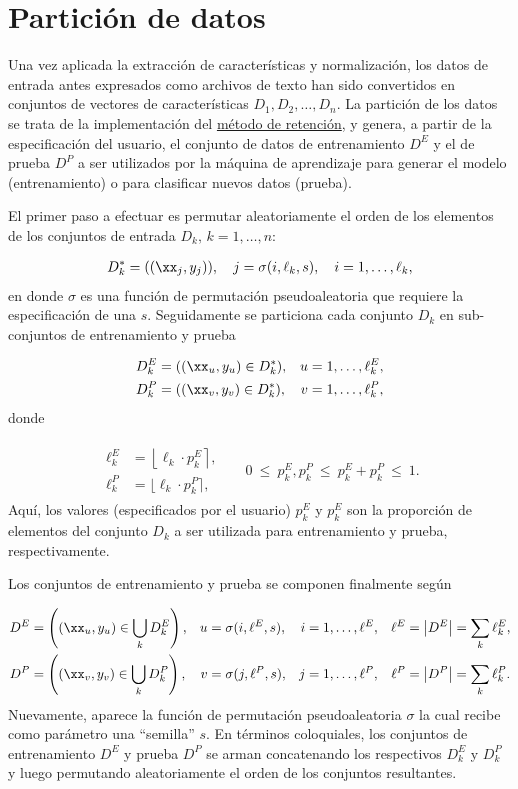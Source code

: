 \section{Partición de datos}
Una vez aplicada la extracción de características y normalización, los
datos de entrada antes expresados como archivos de texto han sido
convertidos en conjuntos de vectores de características
$D_1,D_2,\ldots,D_n$.  La partición de los datos se trata de la
implementación del \hyperref[retención]{método de retención}, y
genera, a partir de la especificación del usuario, el conjunto de
datos de entrenamiento $D^E$ y el de prueba $D^P$ a ser utilizados por
la máquina de aprendizaje para generar el modelo (entrenamiento) o
para clasificar nuevos datos (prueba).

El primer paso a efectuar es permutar aleatoriamente el orden de los
elementos de los conjuntos de entrada $D_k,\,k=1,\ldots,n$:

\begin{align*}
  D^*_k = ((\xx_j,y_j)), \quad j = \sigma(i,\ell_k,s), \quad i=1,\ldots,\ell_k,
\end{align*}
en donde $\sigma$ es una función de permutación pseudoaleatoria que
requiere la especificación de una  $s$. Seguidamente se
particiona cada conjunto $D_k$ en sub-conjuntos de entrenamiento
y prueba

\begin{align*}
  D^E_k &= ((\xx_u,y_u)\in D^*_k),& u&=1,\ldots,\ell^E_k, \\
  D^P_k &= ((\xx_v,y_v)\in D^*_k),& v&=1,\ldots,\ell^P_k,
\end{align*}
donde

\begin{align*}
  \begin{split}
    \ell^E_k &= \left\lfloor\ell_k\cdot p_k^E \right\rceil, \\
    \ell^P_k &= \lfloor\ell_k\cdot p_k^P\rceil,
  \end{split}
  &&
  0\ \leq\ p_k^E, p_k^P\ \leq\  p_k^E + p_k^P\ \leq\ 1.
\end{align*}
Aquí, los valores (especificados por el usuario) $p^E_k$ y $p^E_k$ son
la proporción de elementos del conjunto $D_k$ a ser utilizada para
entrenamiento y prueba, respectivamente.

Los conjuntos de entrenamiento y prueba se componen finalmente según

\begin{align*}
  D^E &= \left( (\xx_u,y_u) \in \bigcup_k {D}^E_k \right), &
  u &= \sigma(i,\ell^E,s), &
  i &= 1,\ldots,\ell^E, &
  \ell^E &= \left| D^E \right| = \sum_k \ell^E_k ,\\
  D^P &= \left( (\xx_v,y_v) \in \bigcup_k {D}^P_k \right), &
  v &= \sigma(j,\ell^P,s), &
  j &= 1,\ldots,\ell^P, &
  \ell^P &= \left| D^P \right| = \sum_k \ell^P_k .
\end{align*}
Nuevamente, aparece la función de permutación pseudoaleatoria $\sigma$
la cual recibe como parámetro una ``semilla'' $s$.
En términos coloquiales, los conjuntos de entrenamiento $D^E$ y prueba $D^P$
se arman concatenando los respectivos $D^E_k$ y $D^P_k$ y luego permutando
aleatoriamente el orden de los conjuntos resultantes.

